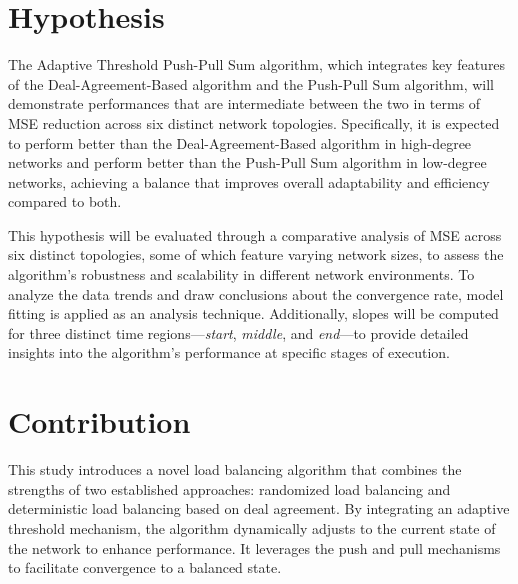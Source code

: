 \section{Hypothesis}\label{sec:hypothesis}
The Adaptive Threshold Push-Pull Sum algorithm, which integrates key features of the Deal-Agreement-Based algorithm and the Push-Pull Sum algorithm, will demonstrate performances that are intermediate between the two in terms of MSE reduction across six distinct network topologies. Specifically, it is expected to perform better than the Deal-Agreement-Based algorithm in high-degree networks and perform better than the Push-Pull Sum algorithm in low-degree networks, achieving a balance that improves overall adaptability and efficiency compared to both.

This hypothesis will be evaluated through a comparative analysis of MSE across six distinct topologies, some of which feature varying network sizes, to assess the algorithm's robustness and scalability in different network environments. To analyze the data trends and draw conclusions about the convergence rate, model fitting is applied as an analysis technique. Additionally, slopes will be computed for three distinct time regions—\textit{start}, \textit{middle}, and \textit{end}—to provide detailed insights into the algorithm's performance at specific stages of execution.

\section{Contribution}\label{sec:contribution}
This study introduces a novel load balancing algorithm that combines the strengths of two established approaches: randomized load balancing and deterministic load balancing based on deal agreement. By integrating an adaptive threshold mechanism, the algorithm dynamically adjusts to the current state of the network to enhance performance. It leverages the push and pull mechanisms to facilitate convergence to a balanced state.